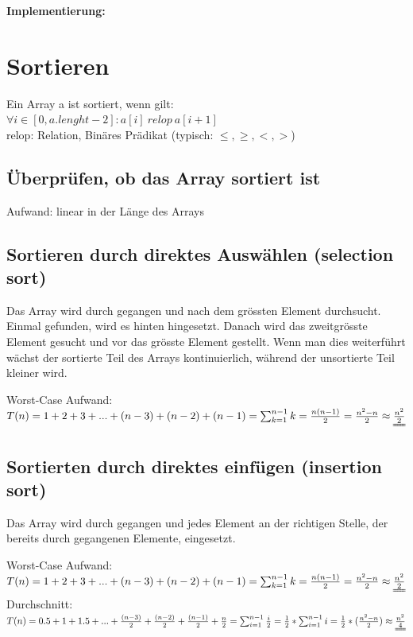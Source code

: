 \documentclass[a4paper,10pt]{article}
\newcommand{\Bold}[1]{\textbf{#1}} %
\begin{document}
\pagebreak
\Bold{Implementierung:}


\pagebreak
\section{Sortieren}
Ein Array a ist sortiert, wenn gilt: \\
$ \forall i \in [0, a.lenght-2] : a[i]\ relop\ a[i+1]$ \\
relop: Relation, Bin\"ares Pr\"adikat (typisch: $\leq,\geq,<,>$)

\subsection{\"Uberpr\"ufen, ob das Array sortiert ist}

Aufwand: linear in der L\"ange des Arrays \\

\subsection{Sortieren durch direktes Ausw\"ahlen (selection sort)}
Das Array wird durch gegangen und nach dem gr\"ossten Element durchsucht. Einmal gefunden, wird es hinten hingesetzt. Danach wird das zweitgr\"osste Element gesucht und vor das gr\"osste Element gestellt. Wenn man dies weiterf\"uhrt w\"achst der sortierte Teil des Arrays kontinuierlich, w\"ahrend der unsortierte Teil kleiner wird.

Worst-Case Aufwand: $T(n)=1+2+3+...+(n-3)+(n-2)+(n-1)=\sum_{k=1}^{n-1} k=\frac{n(n-1)}{2}=\frac{n^2-n}{2}\approx\uuline{\frac{n^2}{2}}$

\subsection{Sortierten durch direktes einf\"ugen (insertion sort)}
Das Array wird durch gegangen und jedes Element an der richtigen Stelle, der bereits durch gegangenen Elemente, eingesetzt.

Worst-Case Aufwand: $T(n)=1+2+3+...+(n-3)+(n-2)+(n-1)=\sum^{n-1}_{k=1} k=\frac{n(n-1)}{2}=\frac{n^2-n}{2}\approx\uuline{\frac{n^2}{2}}$
Durchschnitt: $T(n)=0.5 + 1 + 1.5 + ... + \frac{(n-3)}{2} + \frac{(n-2)}{2} + \frac{(n-1)}{2}  + \frac{n}{2}=\sum^{n-1}_{i=1} \frac{i}{2}=\frac{1}{2}*\sum^{n-1}_{i=1} i = \frac{1}{2}*(\frac{n^2-n}{2})\approx\uuline{\frac{n^2}{4}}$
\end{document}
